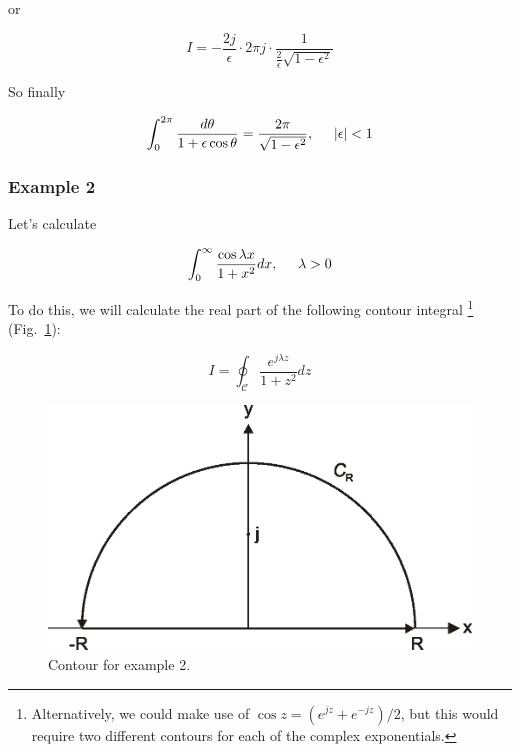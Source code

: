 or

\begin{equation}
I = -\frac{2j}{\epsilon} \cdot 2 \pi j \cdot \frac{1}{\frac{2}{\epsilon} \sqrt{1
- \epsilon^2}}
\end{equation}

So finally

\begin{equation}
\int_0^{2 \pi} \frac{d \theta}{1 + \epsilon \cos \theta} = \frac{2 \pi}{\sqrt{1
- \epsilon^2}}, \hspace{0.5cm} |\epsilon| < 1
\end{equation} 

\subsubsection{Example 2}

Let's calculate

\begin{equation}
\int_0^{\infty}\frac{\cos \lambda x}{1 + x^2} dx, \hspace{0.5cm} \lambda > 0
\end{equation}

To do this, we will calculate the real part of the following contour integral
\footnote{Alternatively, we could make use of $\cos z = (e^{j z} + e^{-jz})/2$,
but this would require two different contours for each of the complex
exponentials.} (Fig.~\ref{fig-example-2}):

\begin{equation}
I = \oint_{\mathcal{C}} \frac{e^{j \lambda z}}{1 + z^2} dz
\end{equation}

\begin{figure}
\centering
\includegraphics{complex/figures/int_ex_2}
\caption{Contour for example 2.}
\label{fig-example-2}
\end{figure}

